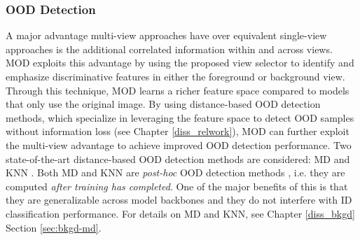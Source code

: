 \subsubsection{OOD Detection}
A major advantage multi-view approaches have over equivalent single-view approaches is the additional correlated information within and across views. MOD exploits this advantage by using the proposed view selector to identify and emphasize discriminative features in either the foreground or background view. Through this technique, MOD learns a richer feature space compared to models that only use the original image. By using distance-based OOD detection methods, which specialize in leveraging the feature space to detect OOD samples without information loss (see Chapter \ref{diss_relwork}), MOD can further exploit the multi-view advantage to achieve improved OOD detection performance. Two state-of-the-art distance-based OOD detection methods are considered: MD \cite{lee2018simple,kamoi2020mahalanobis} and KNN \cite{sun2022out}. Both MD and KNN are \emph{post-hoc} OOD detection methods \cite{yang2022openood}, i.e. they are computed \textit{after training has completed}. One of the major benefits of this is that they are generalizable across model backbones and they do not interfere with ID classification performance. For details on MD and KNN, see Chapter \ref{diss_bkgd} Section \ref{sec:bkgd-md}.

